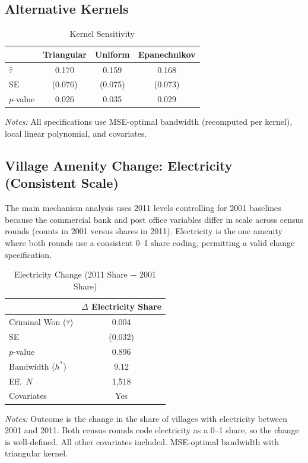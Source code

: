 \documentclass[12pt]{article}
\begin{document}
\subsection{Alternative Kernels}

\begin{table}[H]
\centering
\caption{Kernel Sensitivity}
\label{tab:kernel}
\begin{threeparttable}
\begin{tabular}{lccc}
\toprule
 & Triangular & Uniform & Epanechnikov \\
\midrule
$\hat{\tau}$ & 0.170 & 0.159 & 0.168 \\
SE & (0.076) & (0.075) & (0.073) \\
$p$-value & 0.026 & 0.035 & 0.029 \\
\bottomrule
\end{tabular}
\begin{tablenotes}[flushleft]
\small
\item \textit{Notes:} All specifications use MSE-optimal bandwidth (recomputed per kernel), local linear polynomial, and covariates.
\end{tablenotes}
\end{threeparttable}
\end{table}

\subsection{Village Amenity Change: Electricity (Consistent Scale)}

The main mechanism analysis uses 2011 levels controlling for 2001 baselines because the commercial bank and post office variables differ in scale across census rounds (counts in 2001 versus shares in 2011). Electricity is the one amenity where both rounds use a consistent 0--1 share coding, permitting a valid change specification.

\begin{table}[H]
\centering
\caption{Electricity Change (2011 Share $-$ 2001 Share)}
\label{tab:elec_change}
\begin{threeparttable}
\begin{tabular}{lc}
\toprule
 & $\Delta$ Electricity Share \\
\midrule
Criminal Won ($\hat{\tau}$) & 0.004 \\
SE & (0.032) \\
$p$-value & 0.896 \\[3pt]
Bandwidth ($h^*$) & 9.12 \\
Eff.\ $N$ & 1,518 \\
Covariates & Yes \\
\bottomrule
\end{tabular}
\begin{tablenotes}[flushleft]
\small
\item \textit{Notes:} Outcome is the change in the share of villages with electricity between 2001 and 2011. Both census rounds code electricity as a 0--1 share, so the change is well-defined. All other covariates included. MSE-optimal bandwidth with triangular kernel.
\end{tablenotes}
\end{threeparttable}
\end{table}
\end{document}
